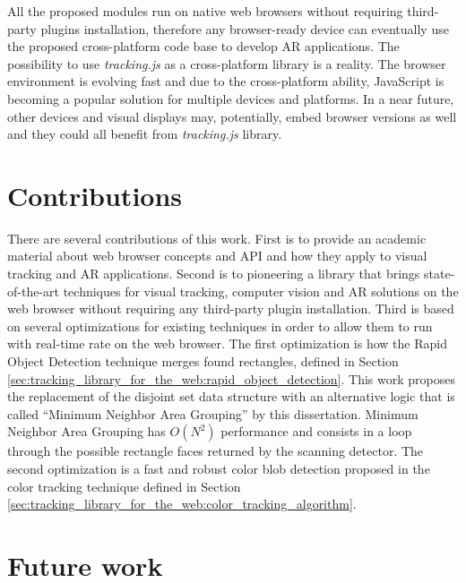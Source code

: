 All the proposed modules run on native web browsers without requiring third-party plugins installation, therefore any browser-ready device can eventually use the proposed cross-platform code base to develop AR applications. The possibility to use \textit{tracking.js} as a cross-platform library is a reality. The browser environment is evolving fast and due to the cross-platform ability, JavaScript is becoming a popular solution for multiple devices and platforms. In a near future, other devices and visual displays may, potentially, embed browser versions as well and they could all benefit from \textit{tracking.js} library.

\section{Contributions} %
\label{sec:conclusion:contributions}

There are several contributions of this work. First is to provide an academic material about web browser concepts and API and how they apply to visual tracking and AR applications. Second is to pioneering a library that brings state-of-the-art techniques for visual tracking, computer vision and AR solutions on the web browser without requiring any third-party plugin installation. Third is based on several optimizations for existing techniques in order to allow them to run with real-time rate on the web browser. The first optimization is how the Rapid Object Detection technique   merges found rectangles, defined in Section \ref{sec:tracking_library_for_the_web:rapid_object_detection}. This work proposes the replacement of the disjoint set data structure with an alternative logic that is called ``Minimum Neighbor Area Grouping'' by this dissertation. Minimum Neighbor Area Grouping has $O(N^2)$ performance \cite{black2007big} and consists in a loop through the possible rectangle faces returned by the scanning detector. The second optimization is a fast and robust color blob detection proposed in the color tracking technique defined in Section \ref{sec:tracking_library_for_the_web:color_tracking_algorithm}.


\section{Future work} %
\label{sec:conclusion:future_work}

